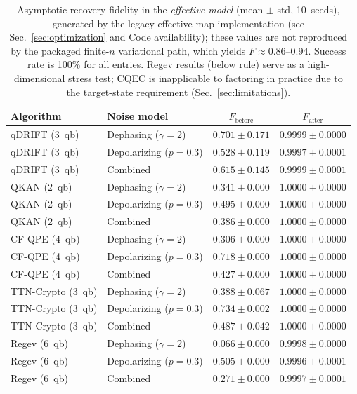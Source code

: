 \documentclass[a4paper,twocolumn]{quantumarticle}
\newenvironment{ruledtabular}{}{}%
\providecommand{\colrule}{\hline}
\begin{document}
\begin{table}[t]
\caption{Asymptotic recovery fidelity in the \emph{effective model} (mean $\pm$ std, 10~seeds), generated by the legacy effective-map implementation (see Sec.~\ref{sec:optimization} and Code availability); these values are not reproduced by the packaged finite-$n$ variational path, which yields $F \approx 0.86$--$0.94$. Success rate is 100\% for all entries. Regev results (below rule) serve as a high-dimensional stress test; CQEC is inapplicable to factoring in practice due to the target-state requirement (Sec.~\ref{sec:limitations}).}
\label{tab:main}
\begin{ruledtabular}
\begin{tabular}{llcc}
Algorithm & Noise model & $F_\mathrm{before}$ & $F_\mathrm{after}$ \\
\colrule
qDRIFT (3~qb) & Dephasing ($\gamma=2$) & $0.701 \pm 0.171$ & $0.9999 \pm 0.0000$ \\
qDRIFT (3~qb) & Depolarizing ($p=0.3$) & $0.528 \pm 0.119$ & $0.9997 \pm 0.0001$ \\
qDRIFT (3~qb) & Combined & $0.615 \pm 0.145$ & $0.9999 \pm 0.0001$ \\
QKAN (2~qb) & Dephasing ($\gamma=2$) & $0.341 \pm 0.000$ & $1.0000 \pm 0.0000$ \\
QKAN (2~qb) & Depolarizing ($p=0.3$) & $0.495 \pm 0.000$ & $1.0000 \pm 0.0000$ \\
QKAN (2~qb) & Combined & $0.386 \pm 0.000$ & $1.0000 \pm 0.0000$ \\
CF-QPE (4~qb) & Dephasing ($\gamma=2$) & $0.306 \pm 0.000$ & $1.0000 \pm 0.0000$ \\
CF-QPE (4~qb) & Depolarizing ($p=0.3$) & $0.718 \pm 0.000$ & $1.0000 \pm 0.0000$ \\
CF-QPE (4~qb) & Combined & $0.427 \pm 0.000$ & $1.0000 \pm 0.0000$ \\
TTN-Crypto (3~qb) & Dephasing ($\gamma=2$) & $0.388 \pm 0.067$ & $1.0000 \pm 0.0000$ \\
TTN-Crypto (3~qb) & Depolarizing ($p=0.3$) & $0.734 \pm 0.002$ & $1.0000 \pm 0.0000$ \\
TTN-Crypto (3~qb) & Combined & $0.487 \pm 0.042$ & $1.0000 \pm 0.0000$ \\
\colrule
Regev (6~qb) & Dephasing ($\gamma=2$) & $0.066 \pm 0.000$ & $0.9998 \pm 0.0000$ \\
Regev (6~qb) & Depolarizing ($p=0.3$) & $0.505 \pm 0.000$ & $0.9996 \pm 0.0001$ \\
Regev (6~qb) & Combined & $0.271 \pm 0.000$ & $0.9997 \pm 0.0001$ \\
\end{tabular}
\end{ruledtabular}
\end{table}
\end{document}
